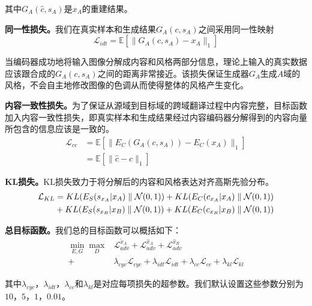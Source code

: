 其中$G_A(\hat{c}, s_A)$是$x_A$的重建结果。

\textbf{同一性损失。}我们在真实样本和生成结果$G_A(c,s_A)$之间采用同一性映射
\begin{equation}
\label{equ:idt}
\mathcal{L}_{idt} = \mathbb{E}[\| G_A(c, s_A) - x_A \|_1]
\end{equation}

当编码器成功地将输入图像分解成内容和风格两部分信息，理论上输入的真实数据应该跟合成的$G_A(c,s_A)$之间的距离非常接近。该损失保证生成器$G_A$生成$A$域的风格，不会自主地修改图像的色调从而使得整体的风格产生变化。

\textbf{内容一致性损失。}为了保证从源域到目标域的跨域翻译过程中内容完整，目标函数加入内容一致性损失，即真实样本和生成结果经过内容编码器分解得到的内容向量所包含的信息应该是一致的。
\begin{equation}
\label{equ:cc}
\begin{aligned}
\mathcal{L}_{cc} & = \mathbb{E}[\| E_C(G_A(c, s_A)) - E_C(x_A) \|_1] \\
      & = \mathbb{E}[\| \hat{c} - c \|_1]
\end{aligned}
\end{equation}

\textbf{KL损失。}KL损失致力于将分解后的内容和风格表达对齐高斯先验分布。
\begin{equation}
\begin{split}
\mathcal{L}_{KL}& = \mathnormal{KL}(E_S(s_{x_A}|x_A)\parallel \mathcal{N}(0,1)) + \mathnormal{KL}(E_C(c_{x_A}|x_A)\parallel \mathcal{N}(0,1)) \\
 & + \mathnormal{KL}(E_S(s_{x_B}|x_B)\parallel \mathcal{N}(0,1)) + \mathnormal{KL}(E_C(c_{x_B}|x_B)\parallel \mathcal{N}(0,1))
\end{split}
\label{eq:KL}
\end{equation}

\textbf{总目标函数。}我们总的目标函数可以概括如下：
\begin{equation}
\label{equ:full}
\begin{aligned}
\min_{E,G}\max_{D} & \mathcal{L}_{adv}^{\tilde{x}_A}+\mathcal{L}_{adv}^{\hat{x}_A}+\mathcal{L}_{adv}^{\hat{x}_B} \\
+&\lambda_{cyc}\mathcal{L}_{cyc}+\lambda_{idt}\mathcal{L}_{idt}+\lambda_{cc}\mathcal{L}_{cc}+\lambda_{kl}\mathcal{L}_{kl}
\end{aligned}
\end{equation}

其中$\lambda_{cyc}$，$\lambda_{idt}$，$\lambda_{cc}$和$\lambda_{kl}$是对应每项损失的超参数。我们默认设置这些参数分别为$10$，$5$，$1$，$0.01$。


